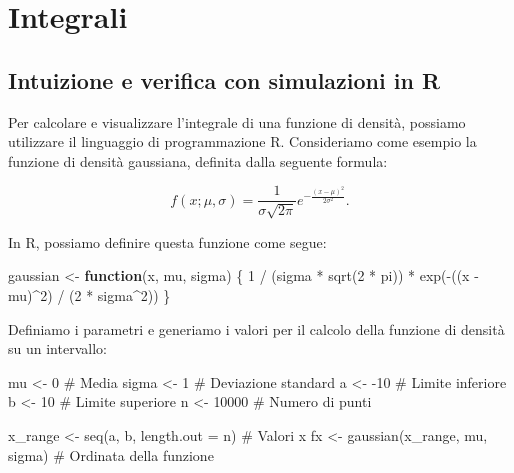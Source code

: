 \documentclass[
  italian,
  letterpaper,
  a4paper,
  11pt,
  open=any]{scrbook}
\newenvironment{Shaded}{\begin{snugshade}}{\end{snugshade}}
\newcommand{\AttributeTok}[1]{\textcolor[rgb]{0.40,0.45,0.13}{#1}}
\newcommand{\CommentTok}[1]{\textcolor[rgb]{0.37,0.37,0.37}{#1}}
\newcommand{\ControlFlowTok}[1]{\textcolor[rgb]{0.00,0.23,0.31}{\textbf{#1}}}
\newcommand{\DecValTok}[1]{\textcolor[rgb]{0.68,0.00,0.00}{#1}}
\newcommand{\FunctionTok}[1]{\textcolor[rgb]{0.28,0.35,0.67}{#1}}
\newcommand{\NormalTok}[1]{\textcolor[rgb]{0.00,0.23,0.31}{#1}}
\newcommand{\OtherTok}[1]{\textcolor[rgb]{0.00,0.23,0.31}{#1}}
\newcommand{\SpecialCharTok}[1]{\textcolor[rgb]{0.37,0.37,0.37}{#1}}
\theoremstyle{plain}
\theoremstyle{definition}
\theoremstyle{definition}
\theoremstyle{remark}
\begin{document}
\section{Integrali}\label{integrali}

\subsection{Intuizione e verifica con simulazioni in
R}\label{intuizione-e-verifica-con-simulazioni-in-r}

Per calcolare e visualizzare l'integrale di una funzione di densità,
possiamo utilizzare il linguaggio di programmazione R. Consideriamo come
esempio la funzione di densità gaussiana, definita dalla seguente
formula:

\[
f(x; \mu, \sigma) = \frac{1}{\sigma \sqrt{2 \pi}} e^{-\frac{(x - \mu)^2}{2 \sigma^2}}.
\]

In R, possiamo definire questa funzione come segue:

\begin{Shaded}
\begin{Highlighting}[]
\NormalTok{gaussian }\OtherTok{\textless{}{-}} \ControlFlowTok{function}\NormalTok{(x, mu, sigma) \{}
  \DecValTok{1} \SpecialCharTok{/}\NormalTok{ (sigma }\SpecialCharTok{*} \FunctionTok{sqrt}\NormalTok{(}\DecValTok{2} \SpecialCharTok{*}\NormalTok{ pi)) }\SpecialCharTok{*} \FunctionTok{exp}\NormalTok{(}\SpecialCharTok{{-}}\NormalTok{((x }\SpecialCharTok{{-}}\NormalTok{ mu)}\SpecialCharTok{\^{}}\DecValTok{2}\NormalTok{) }\SpecialCharTok{/}\NormalTok{ (}\DecValTok{2} \SpecialCharTok{*}\NormalTok{ sigma}\SpecialCharTok{\^{}}\DecValTok{2}\NormalTok{))}
\NormalTok{\}}
\end{Highlighting}
\end{Shaded}

Definiamo i parametri e generiamo i valori per il calcolo della funzione
di densità su un intervallo:

\begin{Shaded}
\begin{Highlighting}[]
\NormalTok{mu }\OtherTok{\textless{}{-}} \DecValTok{0}      \CommentTok{\# Media}
\NormalTok{sigma }\OtherTok{\textless{}{-}} \DecValTok{1}   \CommentTok{\# Deviazione standard}
\NormalTok{a }\OtherTok{\textless{}{-}} \SpecialCharTok{{-}}\DecValTok{10}     \CommentTok{\# Limite inferiore}
\NormalTok{b }\OtherTok{\textless{}{-}} \DecValTok{10}      \CommentTok{\# Limite superiore}
\NormalTok{n }\OtherTok{\textless{}{-}} \DecValTok{10000}   \CommentTok{\# Numero di punti}

\NormalTok{x\_range }\OtherTok{\textless{}{-}} \FunctionTok{seq}\NormalTok{(a, b, }\AttributeTok{length.out =}\NormalTok{ n)  }\CommentTok{\# Valori x}
\NormalTok{fx }\OtherTok{\textless{}{-}} \FunctionTok{gaussian}\NormalTok{(x\_range, mu, sigma)   }\CommentTok{\# Ordinata della funzione}
\end{Highlighting}
\end{Shaded}
\end{document}
